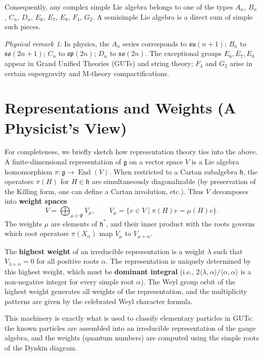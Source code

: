 \documentclass{article}
\theoremstyle{definition}
\theoremstyle{remark}
\newtheorem{physremark}[theorem]{Physical remark}
\newcommand{\End}{\operatorname{End}}
\newcommand{\g}{\mathfrak{g}}
\newcommand{\h}{\mathfrak{h}}
\begin{document}
Consequently, any complex simple Lie algebra belongs to one of the types $A_n$,
$B_n$, $C_n$, $D_n$, $E_6$, $E_7$, $E_8$, $F_4$, $G_2$. A semisimple Lie algebra
is a direct sum of simple such pieces.

\begin{physremark}
In physics, the $A_n$ series corresponds to $\mathfrak{su}(n+1)$; $B_n$ to
$\mathfrak{so}(2n+1)$; $C_n$ to $\mathfrak{sp}(2n)$; $D_n$ to $\mathfrak{so}(2n)$.
The exceptional groups $E_6, E_7, E_8$ appear in Grand Unified Theories (GUTs)
and string theory; $F_4$ and $G_2$ arise in certain supergravity and M‑theory
compactifications.
\end{physremark}

\section{Representations and Weights (A Physicist’s View)}
\label{sec:rep}
For completeness, we briefly sketch how representation theory ties into the above.
A finite‑dimensional representation of $\g$ on a vector space $V$ is a Lie algebra
homomorphism $\pi:\g\to\End(V)$.  When restricted to a Cartan subalgebra $\h$, the
operators $\pi(H)$ for $H\in\h$ are simultaneously diagonalizable (by preservation
of the Killing form, one can define a Cartan involution, etc.).  Thus $V$ decomposes
into \textbf{weight spaces}
\[
V = \bigoplus_{\mu\in\Phi} V_\mu,\qquad V_\mu = \{v\in V \mid \pi(H)v = \mu(H)v\}.
\]
The weights $\mu$ are elements of $\h^*$, and their inner product with the roots
governs which root operators $\pi(X_\alpha)$ map $V_\mu$ to $V_{\mu+\alpha}$.

The \textbf{highest weight} of an irreducible representation is a weight $\lambda$
such that $V_{\lambda+\alpha}=0$ for all positive roots $\alpha$.  The representation
is uniquely determined by this highest weight, which must be \textbf{dominant integral}
(i.e., $2\langle\lambda,\alpha\rangle/\langle\alpha,\alpha\rangle$ is a non‑negative
integer for every simple root $\alpha$).  The Weyl group orbit of the highest weight
generates all weights of the representation, and the multiplicity patterns are given
by the celebrated Weyl character formula.

This machinery is exactly what is used to classify elementary particles in GUTs:
the known particles are assembled into an irreducible representation of the gauge
algebra, and the weights (quantum numbers) are computed using the simple roots of
the Dynkin diagram.
\end{document}

